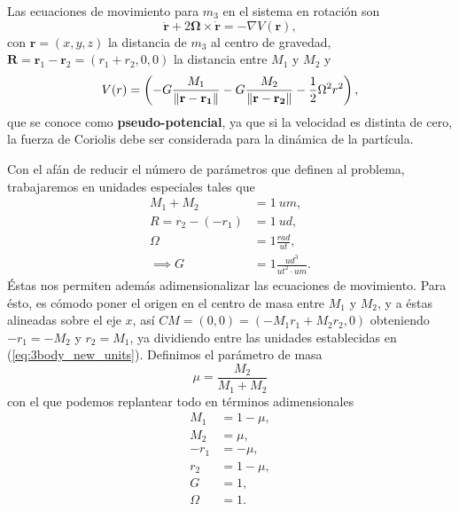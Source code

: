 Las ecuaciones de movimiento para $m_3$ en el sistema en rotación son
\begin{equation}
 \ddot{\mathbf{r}} + 2\mathbf{\Omega} \times \dot{\mathbf{r}} = - \nabla V(\mathbf{r}),
 \label{eq:3body_restricted_acceleration}
\end{equation}
con $\mathbf{r} = (x,y,z)$ la distancia de $m_3$ al centro de gravedad, $\mathbf{R} = \mathbf{r}_1 - \mathbf{r}_2 = (r_1 + r_2,0,0)$ la distancia entre $M_1$ y $M_2$ y
\begin{equation}
 V(r) = \left( -G \frac{M_1}{\left\lVert\mathbf{r}-\mathbf{r_1}\right\rVert} - G \frac{M_2}{\left\lVert\mathbf{r}-\mathbf{r_2}\right\rVert} - \frac{1}{2} \Omega^2 r^2 \right),
 \label{eq:3body_restricted_potential}
\end{equation} 
que se conoce como \textbf{pseudo-potencial}, ya que si la velocidad es distinta de cero, la fuerza de Coriolis debe ser considerada para la dinámica de la partícula.

Con el afán de reducir el número de parámetros que definen al problema, trabajaremos en unidades especiales tales que 
\begin{align}
 M_1 + M_2 &= 1 \ um, \nonumber \\
 R = r_2 - (-r_1) &= 1 \ ud, \nonumber \\
 \Omega &= 1 \frac{rad}{ut}, \nonumber \\
 \implies G &= 1 \frac{ud^3}{ut^2 \cdot um}. 
 \label{eq:3body_new_units}
\end{align}
Éstas nos permiten además adimensionalizar las ecuaciones de movimiento. Para ésto, es cómodo poner el origen en el centro de masa entre $M_1$ y $M_2$, y a éstas alineadas sobre el eje $x$, así $CM = (0,0) = (-M_1r_1 + M_2r_2, 0)$ obteniendo $-r_1 = -M_2$ y $r_2 =M_1$, ya dividiendo entre las unidades establecidas en (\ref{eq:3body_new_units}). Definimos el parámetro de masa 
\begin{equation*}
 \mu = \frac{M_2}{M_1 + M_2} 
\end{equation*}
con el que podemos replantear todo en términos adimensionales
\begin{align}
 M_1 &= 1 - \mu, \nonumber \\
 M_2 &= \mu, \nonumber \\
 -r_1 &= -\mu, \nonumber \\
 r_2 &= 1 - \mu, \nonumber \\
 G &= 1 \nonumber, \\
 \Omega &= 1.
 \label{eq:3body_adimensional_units}
\end{align}

